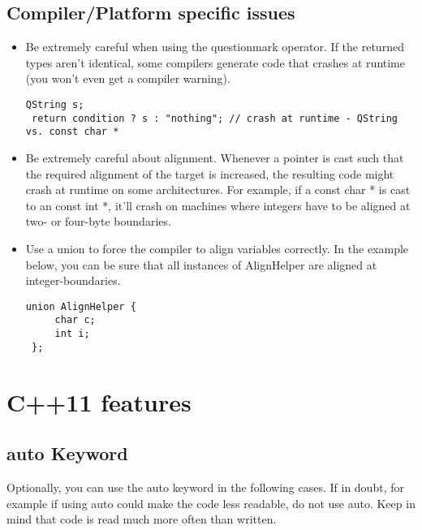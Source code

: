 \documentclass[a4paper,12pt]{article}
\begin{document}
\subsection{Compiler/Platform specific issues}
\begin{itemize}
\item Be extremely careful when using the questionmark operator. If the returned types aren't identical, some compilers generate code that crashes at runtime (you won't even get a compiler warning).
\begin{lstlisting}[breaklines]
 QString s;
 return condition ? s : "nothing"; // crash at runtime - QString vs. const char *
 \end{lstlisting}
\item Be extremely careful about alignment. Whenever a pointer is cast such that the required alignment of the target is increased, the resulting code might crash at runtime on some architectures. For example, if a const char * is cast to an const int *, it'll crash on machines where integers have to be aligned at two- or four-byte boundaries.
\item Use a union to force the compiler to align variables correctly. In the example below, you can be sure that all instances of AlignHelper are aligned at integer-boundaries.
\begin{lstlisting}[breaklines]
union AlignHelper {
     char c;
     int i;
 };
 \end{lstlisting}
\end{itemize}

\clearpage
\newpage

\section{C++11 features}\label{sec:cpp11_features}

\subsection{auto Keyword}
Optionally, you can use the auto keyword in the following cases. If in doubt, for example if using auto could make the code less readable, do not use auto. Keep in mind that code is read much more often than written.
\end{document}
